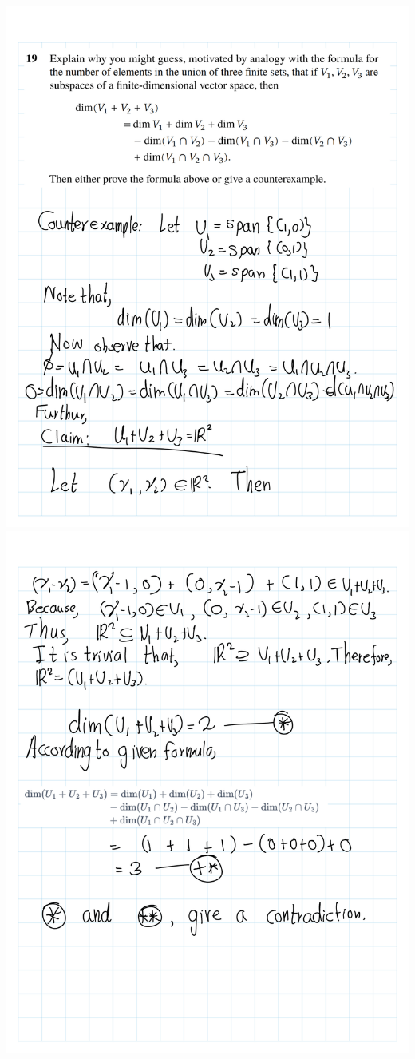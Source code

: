 \documentclass[
]{book}
\theoremstyle{definition}
\theoremstyle{definition}
\theoremstyle{definition}
\theoremstyle{definition}
\theoremstyle{remark}
\begin{document}
\includegraphics{fig/Ex 2B and 2C/Ex 2c (52).png}
\includegraphics{fig/Ex 2B and 2C/Ex 2c (53).png}
\end{document}
